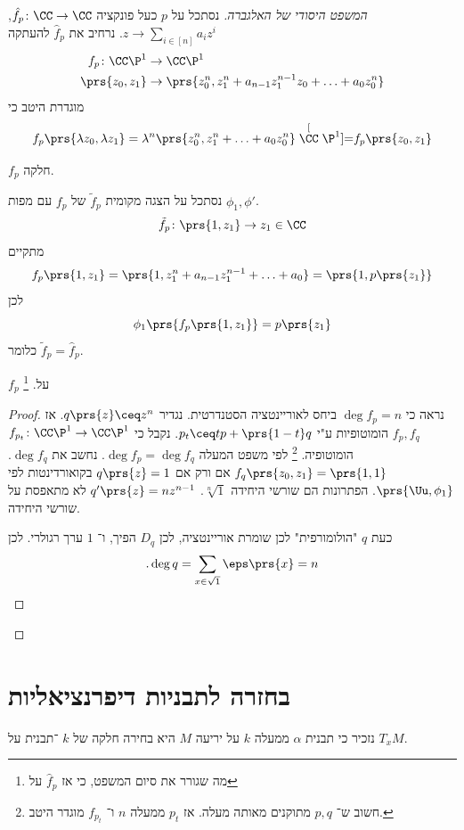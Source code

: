 \documentclass[a4paper,10pt,twoside,openany]{book}
\begin{document}
\begin{proof}[המשפט היסודי של האלגברה]
נסתכל על
$p$
כעל פונקציה
$\hat{f}_p \colon \CC \to \CC$,
$z \to \sum_{i \in [n]} a_i z^i$.
נרחיב את
$\hat{f}_p$
להעתקה
\begin{align*}
f_p \colon \CC\P^1 &\to \CC\P^1 \\
\prs{z_0, z_1} &\to \prs{z_0^n, z_1^n + a_{n-1}z_1^{n-1}z_0 + \ldots + a_0 z_0^n}
\end{align*}
מוגדרת היטב כי
\[f_p\prs{\lambda z_0, \lambda z_1} = \lambda^n \prs{z_0^n, z_1^n + \ldots + a_0 z_0^n} \stackrel[\CC\P^1]{}{=} f_p\prs{z_0, z_1}\]

\begin{exercise}
$f_p$
חלקה.
\end{exercise}

נסתכל על הצגה מקומית
$\tilde{f}_p$
של
$f_p$
עם מפות
$\phi_1, \phi'$.
\[\tilde{f}_p \colon \prs{1,z_1} \to z_1 \in \CC\]
מתקיים
\[f_p \prs{1,z_1} = \prs{1, z_1^n + a_{n-1}z_1^{n-1} + \ldots + a_0} = \prs{1,p\prs{z_1}}\]
לכן
\[\phi_1\prs{f_p\prs{1,z_1}} = p\prs{z_1}\]
כלומר
$\tilde{f}_p = \hat{f}_p$.

\begin{proposition}
$f_p$
על.%
\footnote{מה שגורר את סיום המשפט, כי אז
$\hat{f}_p$
על}
\end{proposition}
\begin{proof}
נראה כי
$\deg f_p = n$
ביחס לאוריינטציה הסטנדרטית.
נגדיר
$q\prs{z} \ceq z^n$.
אז
$f_p, f_q$
הומוטופיות ע"י
$p_t \ceq tp + \prs{1-t}q$.
נקבל כי
$f_{p_t} \colon \CC\P^1 \to \CC\P^1$
הומוטופיה.%
\footnote{חשוב ש־%
$p,q$
מתוקנים מאותה מעלה. אז
$p_t$
ממעלה
$n$
ו־%
$f_{p_t}$
מוגדר היטב.}
לפי משפט המעלה
$\deg f_p = \deg f_q$.
נחשב את
$\deg f_q$.
$f_q\prs{z_0, z_1} = \prs{1,1}$
אם ורק אם
$q\prs{z}  = 1$
בקואורדינטות לפי
$\prs{\Uu, \phi_1}$.
הפתרונות הם שורשי היחידה
$\sqrt[n]{1}$.
$q'\prs{z} = n z^{n-1}$
לא מתאפסת על שורשי היחידה.

כעת
$q$
"הולומורפית" לכן שומרת אוריינטציה, לכן
$D_q$
הפיך, ו־%
$1$
ערך רגולרי.
לכן
\[\text{.} \deg q = \sum_{x \in \sqrt{1}} \eps\prs{x} = n\]
\end{proof}
\end{proof}

\section{בחזרה לתבניות דיפרנציאליות}

נזכיר כי תבנית
$\alpha$
ממעלה
$k$
על יריעה
$M$
היא בחירה חלקה של
$k$%
־תבנית על
$T_x M$.
\end{document}
